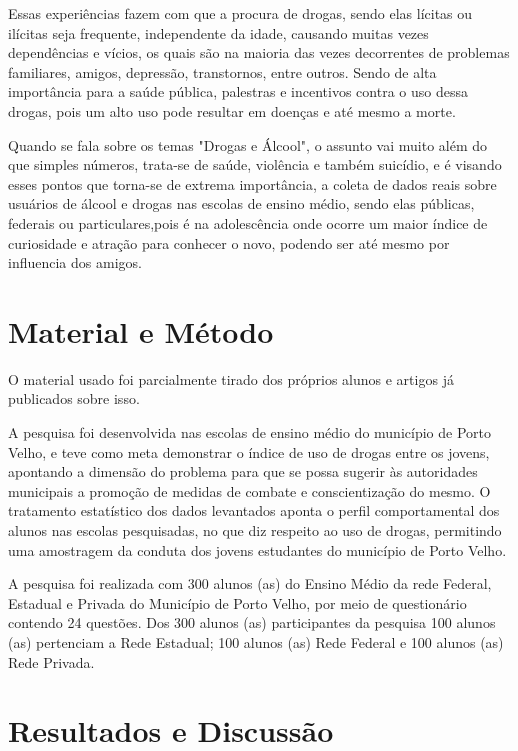 \documentclass[article,12pt,onesidea,4paper,english,brazil]{abntex2}
\begin{document}
Essas experiências fazem com que a procura de drogas, sendo elas lícitas ou ilícitas seja frequente, independente da idade, causando muitas vezes dependências e vícios, os quais são na maioria das vezes decorrentes de problemas familiares, amigos, depressão, transtornos, entre outros. Sendo de alta importância para a saúde pública, palestras e incentivos contra o uso dessa drogas, pois um alto uso pode resultar em doenças e até mesmo a morte.

Quando se fala sobre os temas "Drogas e Álcool", o assunto vai muito além do que simples números, trata-se de saúde, violência e também suicídio, e é visando esses pontos que torna-se de extrema importância, a coleta de dados reais sobre usuários de álcool e drogas nas escolas de ensino médio, sendo elas públicas, federais ou particulares,pois é na adolescência onde ocorre um maior índice de curiosidade e atração para conhecer o novo, podendo ser até mesmo por influencia dos amigos.


	
	\section*{Material e Método}
	
O material usado foi parcialmente tirado dos próprios alunos e artigos já publicados sobre isso.

A pesquisa foi desenvolvida nas escolas de ensino médio do município de Porto Velho, e teve como meta demonstrar o índice de uso de drogas entre os jovens, apontando a dimensão do problema para que se possa sugerir às autoridades municipais a promoção de medidas de combate e conscientização do mesmo. O tratamento estatístico dos dados levantados aponta o perfil comportamental dos alunos nas escolas pesquisadas, no que diz respeito ao uso de drogas, permitindo uma amostragem da conduta dos jovens estudantes do município de Porto Velho.

A pesquisa foi realizada com 300 alunos (as) do Ensino Médio da rede Federal, Estadual e Privada do Município de Porto Velho, por meio de questionário contendo 24 questões. Dos 300 alunos (as) participantes da pesquisa 100 alunos (as) pertenciam a Rede Estadual; 100 alunos (as) Rede Federal e 100 alunos (as) Rede Privada.
	
	\section*{Resultados e Discussão}
	
\end{document}
